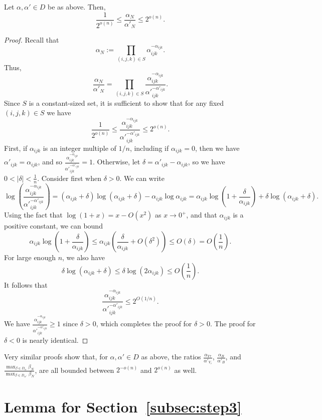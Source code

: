 \documentclass{theoretics}
\begin{document}
\begin{lemma}
Let $\alpha,\alpha' \in D$ be as above. Then, $$\frac{1}{2^{o(n)}} \leq \frac{\alpha_N}{\alpha'_N} \leq 2^{o(n)}.$$
\end{lemma}

\begin{proof}
Recall that $$\alpha_N := \prod_{(i,j,k) \in S} \alpha_{ijk}^{-\alpha_{ijk}}.$$ Thus, $$\frac{\alpha_N}{\alpha'_N} = \prod_{(i,j,k) \in S} \frac{\alpha_{ijk}^{-\alpha_{ijk}}}{{\alpha'}_{ijk}^{-{\alpha'}_{ijk}}}.$$
Since $S$ is a constant-sized set, it is sufficient to show that for any fixed $(i,j,k) \in S$ we have $$\frac{1}{2^{o(n)}} \leq \frac{\alpha_{ijk}^{-\alpha_{ijk}}}{{\alpha'}_{ijk}^{-\alpha'_{ijk}}}\leq 2^{o(n)}.$$
First, if $\alpha_{ijk}$ is an integer multiple of $1/n$, including if $\alpha_{ijk}=0$, then we have $\alpha'_{ijk} = \alpha_{ijk}$, and so $\frac{\alpha_{ijk}^{-\alpha_{ijk}}}{{\alpha'}_{ijk}^{-{\alpha'}_{ijk}}} = 1$.
Otherwise, let $\delta = \alpha'_{ijk} - \alpha_{ijk}$, so we have $0 < |\delta| < \frac{1}{n}$. Consider first when $\delta>0$. We can write 
$$\log\left( \frac{\alpha_{ijk}^{-\alpha_{ijk}}}{{\alpha'}_{ijk}^{-\alpha'_{ijk}}} \right) = (\alpha_{ijk} + \delta) \log(\alpha_{ijk}+\delta) - \alpha_{ijk} \log \alpha_{ijk} = \alpha_{ijk} \log\left(1 + \frac{\delta}{\alpha_{ijk}}\right) + \delta \log(\alpha_{ijk} + \delta).$$
Using the fact that $\log(1+x) = x - O(x^2)$ as $x \to 0^+$, and that $\alpha_{ijk}$ is a positive constant, we can bound $$\alpha_{ijk} \log\left(1 + \frac{\delta}{\alpha_{ijk}}\right) \leq \alpha_{ijk} \left( \frac{\delta}{\alpha_{ijk}} + O(\delta^2) \right) \leq O(\delta) = O\left(\frac{1}{n}\right).$$
For large enough $n$, we also have
$$\delta \log(\alpha_{ijk} + \delta) \leq \delta \log(2\alpha_{ijk}) \leq O\left(\frac{1}{n}\right).$$
It follows that $$\frac{\alpha_{ijk}^{-\alpha_{ijk}}}{{\alpha'}_{ijk}^{-\alpha'_{ijk}}} \leq 2^{O(1/n)}.$$ We have $\frac{\alpha_{ijk}^{-\alpha_{ijk}}}{{\alpha'}_{ijk}^{-{\alpha'}_{ijk}}} \geq 1$ since $\delta>0$, which completes the proof for $\delta>0$. The proof for $\delta<0$ is nearly identical. 
\end{proof}

Very similar proofs show that, for $\alpha,\alpha' \in D$ as above, the ratios $\frac{\alpha_{V{\tau}}}{\alpha'_{V_\tau}}$, $\frac{\alpha_B}{\alpha'_B}$, and $\frac{\max_{\beta\in D_\alpha} \beta_N}{\max_{\beta\in D_{\alpha'}} \beta_N}$, are all bounded between $2^{-o(n)}$ and $2^{o(n)}$ as well.

\section{Lemma for Section~\ref{subsec:step3}}\label{app:powermean}
\end{document}
